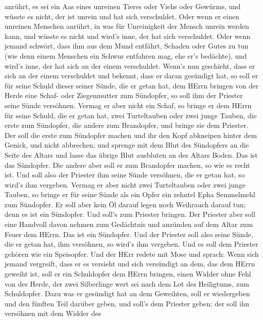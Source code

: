 anrührt, es sei ein Aas eines unreinen Tieres oder Viehs oder Gewürms,
und wüsste es nicht, der ist unrein und hat sich verschuldet.
 Oder wenn er einen unreinen Menschen anrührt, in was für
Unreinigkeit der Mensch unrein werden kann, und wüsste es nicht und
wird's inne, der hat sich verschuldet.  Oder wenn jemand
schwört, dass ihm aus dem Mund entfährt, Schaden oder Gutes zu tun (wie
denn einem Menschen ein Schwur entfahren mag, ehe er's bedächte), und
wird's inne, der hat sich an der einem verschuldet.  Wenn's
nun geschieht, dass er sich an der einem verschuldet und bekennt, dass
er daran gesündigt hat,  so soll er für seine Schuld dieser
seiner Sünde, die er getan hat, dem HErrn bringen von der Herde eine
Schaf- oder Ziegenmutter zum Sündopfer, so soll ihm der Priester seine
Sünde versöhnen.  Vermag er aber nicht ein Schaf, so bringe
er dem HErrn für seine Schuld, die er getan hat, zwei Turteltauben oder
zwei junge Tauben, die erste zum Sündopfer, die andere zum Brandopfer,
 und bringe sie dem Priester. Der soll die erste zum
Sündopfer machen und ihr den Kopf abkneipen hinter dem Genick, und nicht
abbrechen;  und sprenge mit dem Blut des Sündopfers an die
Seite des Altars und lasse das übrige Blut ausbluten an des Altars
Boden. Das ist das Sündopfer.  Die andere aber soll er zum
Brandopfer machen, so wie es recht ist. Und soll also der Priester ihm
seine Sünde versöhnen, die er getan hat, so wird's ihm vergeben.
 Vermag er aber nicht zwei Turteltauben oder zwei junge
Tauben, so bringe er für seine Sünde als ein Opfer ein zehntel Epha
Semmelmehl zum Sündopfer. Er soll aber kein Öl darauf legen noch
Weihrauch darauf tun; denn es ist ein Sündopfer.  Und
soll's zum Priester bringen. Der Priester aber soll eine Handvoll davon
nehmen zum Gedächtnis und anzünden auf dem Altar zum Feuer dem HErrn.
Das ist ein Sündopfer.  Und der Priester soll also seine
Sünde, die er getan hat, ihm versöhnen, so wird's ihm vergeben. Und es
soll dem Priester gehören wie ein Speisopfer.  Und der HErr
redete mit Mose und sprach:  Wenn sich jemand vergreift,
dass er es versieht und sich versündigt an dem, das dem HErrn geweiht
ist, soll er ein Schuldopfer dem HErrn bringen, einen Widder ohne Fehl
von der Herde, der zwei Silberlinge wert sei nach dem Lot des
Heiligtums, zum Schuldopfer.  Dazu was er gesündigt hat an
dem Geweihten, soll er wiedergeben und den fünften Teil darüber geben,
und soll's dem Priester geben; der soll ihn versöhnen mit dem Widder des
